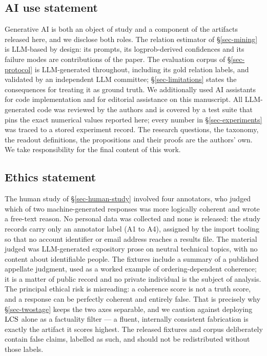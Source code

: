 \label{end-of-body}

\subsection*{AI use statement}

Generative AI is both an object of study and a component of the artifacts released here, and we
disclose both roles. The relation estimator of \S\ref{sec-mining} is LLM-based by design: its
prompts, its logprob-derived confidences and its failure modes are contributions of the paper. The
evaluation corpus of \S\ref{sec-protocol} is LLM-generated throughout, including its gold relation
labels, and validated by an independent LLM committee; \S\ref{sec-limitations} states the
consequences for treating it as ground truth. We additionally used AI assistants for code
implementation and for editorial assistance on this manuscript. All LLM-generated code was reviewed
by the authors and is covered by a test suite that pins the exact numerical values reported here;
every number in \S\ref{sec-experiments} was traced to a stored experiment record. The research
questions, the taxonomy, the readout definitions, the propositions and their proofs are the authors'
own. We take responsibility for the final content of this work.

\subsection*{Ethics statement}

The human study of \S\ref{sec-human-study} involved four annotators, who judged which of two
machine-generated responses was more logically coherent and wrote a free-text reason. No personal data
was collected and none is released: the study records carry only an annotator label (\textsf{A1} to
\textsf{A4}), assigned by the import tooling so that no account identifier or email address reaches a
results file. The material judged was LLM-generated expository prose on neutral technical topics, with
no content about identifiable people. %
The fixtures include a summary of a published appellate judgment, used as a worked example of
ordering-dependent coherence; it is a matter of public record and no private individual is the subject
of analysis. The principal
ethical risk is misreading: a coherence score is not a truth score, and a response can be perfectly
coherent and entirely false. That is precisely why \S\ref{sec-twostage} keeps the two axes
separable, and we caution against deploying $\mathrm{LCS}$ alone as a factuality filter --- a fluent,
internally consistent fabrication is exactly the artifact it scores highest. The released fixtures
and corpus deliberately contain false claims, labelled as such, and should not be redistributed
without those labels.

